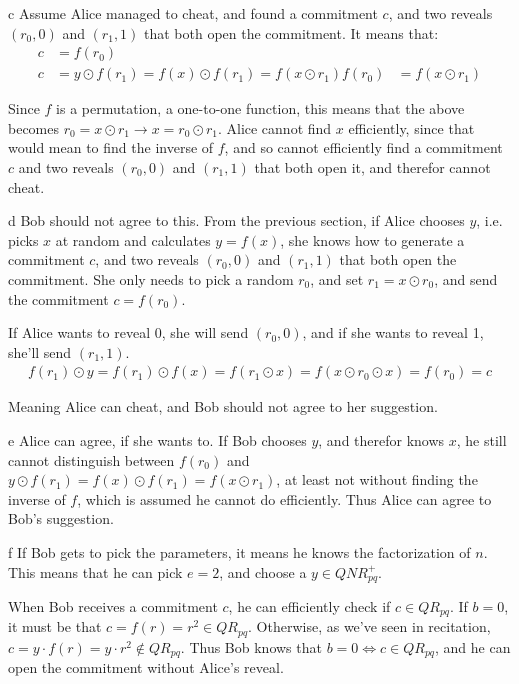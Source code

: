 \documentclass{article}
\begin{document}
\begin{paragraph}
    c Assume Alice managed to cheat, and found a commitment \(c\), and two reveals \((r_0, 0)\) and \((r_1, 1)\) that both open the commitment. It means that:
    \begin{align*}
        c &= f(r_0)\\
        c &= y \odot f(r_1) = f(x) \odot f(r_1) = f(x \odot r_1)
        f(r_0) &= f(x \odot r_1)
    \end{align*}
    
    Since \(f\) is a permutation, a one-to-one function, this means that the above becomes \(r_0 = x \odot r_1 \rightarrow x = r_0 \odot r_1\). Alice cannot find \(x\) efficiently, since that would mean to find the inverse of \(f\), and so cannot efficiently find a commitment \(c\) and two reveals \((r_0, 0)\) and \((r_1, 1)\) that both open it, and therefor cannot cheat.
\end{paragraph}

\begin{paragraph}
    d Bob should not agree to this. From the previous section, if Alice chooses \(y\), i.e. picks \(x\) at random and calculates \(y = f(x)\), she knows how to generate a commitment \(c\), and two reveals \((r_0, 0)\) and \((r_1, 1)\) that both open the commitment. She only needs to pick a random \(r_0\), and set \(r_1 = x \odot r_0\), and send the commitment \(c = f(r_0)\).
    
    If Alice wants to reveal 0, she will send \((r_0, 0)\), and if she wants to reveal 1, she'll send \((r_1, 1)\).
    \begin{align*}
        f(r_1) \odot y = f(r_1) \odot f(x) = f(r_1 \odot x) = f(x \odot r_0 \odot x) = f(r_0) = c
    \end{align*}
    
    Meaning Alice can cheat, and Bob should not agree to her suggestion.
\end{paragraph}

\begin{paragraph}
    e Alice can agree, if she wants to. If Bob chooses \(y\), and therefor knows \(x\), he still cannot distinguish between \(f(r_0)\) and \(y \odot f(r_1) = f(x) \odot f(r_1) = f(x \odot r_1)\), at least not without finding the inverse of \(f\), which is assumed he cannot do efficiently. Thus Alice can agree to Bob's suggestion.
\end{paragraph}

\begin{paragraph}
    f If Bob gets to pick the parameters, it means he knows the factorization of \(n\). This means that he can pick \(e = 2\), and choose a \(y \in QNR^+_{pq}\).
    
    When Bob receives a commitment \(c\), he can efficiently check if \(c \in QR_{pq}\). If \(b = 0\), it must be that \(c = f(r) = r^2 \in QR_{pq}\). Otherwise, as we've seen in recitation, \(c = y \cdot f(r) = y \cdot r^2 \not\in QR_{pq}\). Thus Bob knows that \(b = 0 \iff c \in QR_{pq}\), and he can open the commitment without Alice's reveal.
\end{paragraph}
\end{document}
